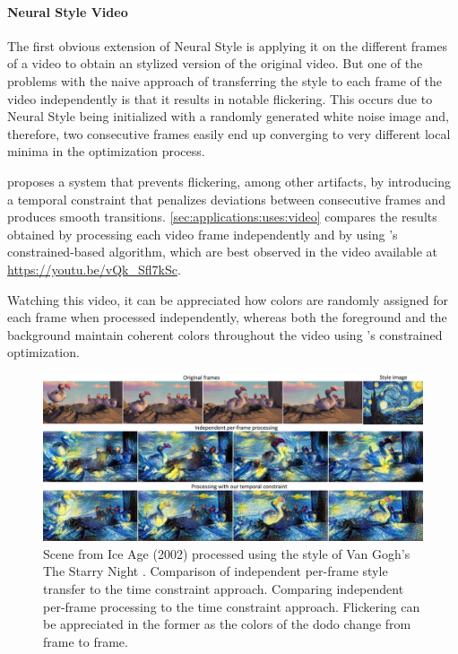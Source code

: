 \paragraph{Neural Style Video}
The first obvious extension of Neural Style is applying it on the different frames of a video to obtain an stylized version of the original video.
But one of the problems with the naive approach of transferring the style to each frame of the video independently is that it results in notable flickering.
This occurs due to Neural Style being initialized with a randomly generated white noise image and, therefore, two consecutive frames easily end up converging to very different local minima in the optimization process.

\citet{Ruder2016} proposes a system that prevents flickering, among other artifacts, by introducing a temporal constraint that penalizes deviations between consecutive frames and produces smooth transitions.
\autoref{sec:applications:uses:video} compares the results obtained by processing each video frame independently and by using \citeauthor{Ruder2016}'s constrained-based algorithm, which are best observed in the video available at \url{https://youtu.be/vQk_Sfl7kSc}.

Watching this video, it can be appreciated how colors are randomly assigned for each frame when processed independently, whereas both the foreground and the background maintain coherent colors throughout the video using \citeauthor{Ruder2016}'s constrained optimization.

\begin{figure}[t]
  \includegraphics[width=\textwidth]{gfx/app-neural-video}
  \caption{
    Scene from Ice Age (2002) processed using the style of Van Gogh's The Starry Night \cite{Ruder2016}.
    Comparison of independent per-frame style transfer to the time constraint approach.
    Comparing independent per-frame processing to the time constraint approach.
    Flickering can be appreciated in the former as the colors of the dodo change from frame to frame.
  }
  \label{sec:applications:uses:video}
\end{figure}

